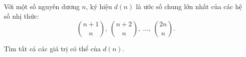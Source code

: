 \ifshowproblem
\begin{problem}\label{example:ROM-2015-P5}
    Với một số nguyên dương \( n \), ký hiệu \( d(n) \) là ước số chung lớn nhất của các hệ số nhị thức:
    \[
        \binom{n+1}{n},\ \binom{n+2}{n},\ \ldots,\ \binom{2n}{n}.
    \]
    
    Tìm tất cả các giá trị có thể của \( d(n) \).
\end{problem}
\fi

\fi